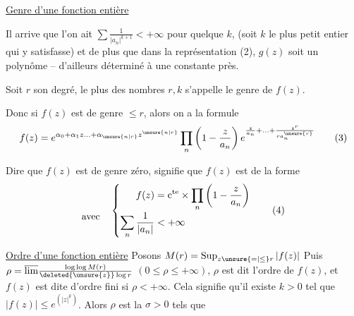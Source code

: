 \uline{Genre d'une fonction entière}

Il arrive que l'on ait $\sum\frac{1}{|a_n|^{k+1}}<+\infty$
pour quelque $k$, (soit $k$ le plus petit entier qui
y satisfasse) et de plus que dans la représentation (2),
$g(z)$ soit un polynôme --
d'ailleurs déterminé à une constante près.

Soit $r$ son degré, le plus   des
nombres $r,k$ s'appelle le genre de $f(z)$.

Donc si $f(z)$ est de genre $\leq r$, alors on
a la formule
\[ f(z)=e^{\alpha_0+\alpha_1 z\ldots+\alpha_{\unsure{n|r}}z^{\unsure{n|r}}}\prod_n\left(1-\frac{z}{a_n}\right)e^{\frac{z}{a_n}+\ldots+\frac{z^r}{r a_n^{\unsure{r}}}}\tag*{(3)} \]

Dire que $f(z)$ est de genre zéro, signifie
que $f(z)$ est de la forme
\[ \begin{aligned} \vphantom{f(z)}\\[-2pt]\text{avec}\quad \end{aligned}\left\{\begin{aligned} f(z)&=\mathrm c^{\mathrm{te}}\times\prod_n\left(1-\frac{z}{a_n}\right)\\[-2pt] \sum_n\frac{1}{|a_n|}&<+\infty \end{aligned}\right. \tag*{(4)} \]

\uline{Ordre d'une fonction entière} \quad Posons $M(r)=\mathop{\rm Sup}_{z\unsure{=|\leq}r}|f(z)|$
Puis $\rho=\overline{\lim}\frac{\log\log M(r)}{\deleted{\unsure{z}}\log r}$ \quad $(0\leq\rho\leq+\infty)$, $\rho$ est
dit l'ordre de $f(z)$, et $f(z)$ est dite d'ordre
fini si $\rho<+\infty$. Cela signifie qu'il existe
$k>0$ tel que $|f(z)|\leq e^{(|z|^k)}$. Alors $\rho$
est la   $\sigma>0$ tels que
